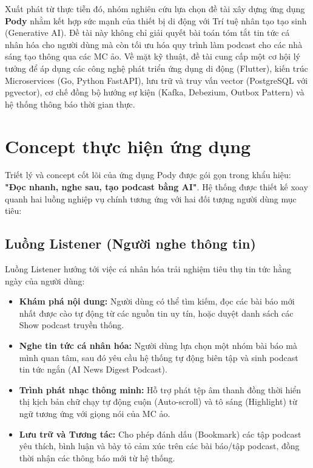 \documentclass[12pt,a4paper]{report}
\begin{document}
Xuất phát từ thực tiễn đó, nhóm nghiên cứu lựa chọn đề tài xây dựng ứng dụng \textbf{Pody} nhằm kết hợp sức mạnh của thiết bị di động với Trí tuệ nhân tạo tạo sinh (Generative AI). Đề tài này không chỉ giải quyết bài toán tóm tắt tin tức cá nhân hóa cho người dùng mà còn tối ưu hóa quy trình làm podcast cho các nhà sáng tạo thông qua các MC ảo. Về mặt kỹ thuật, đề tài cung cấp một cơ hội lý tưởng để áp dụng các công nghệ phát triển ứng dụng di động (Flutter), kiến trúc Microservices (Go, Python FastAPI), lưu trữ và truy vấn vector (PostgreSQL với pgvector), cơ chế đồng bộ hướng sự kiện (Kafka, Debezium, Outbox Pattern) và hệ thống thông báo thời gian thực.

\section{Concept thực hiện ứng dụng}
Triết lý và concept cốt lõi của ứng dụng Pody được gói gọn trong khẩu hiệu: \textbf{"Đọc nhanh, nghe sau, tạo podcast bằng AI"}. Hệ thống được thiết kế xoay quanh hai luồng nghiệp vụ chính tương ứng với hai đối tượng người dùng mục tiêu:

\subsection{Luồng Listener (Người nghe thông tin)}
Luồng Listener hướng tới việc cá nhân hóa trải nghiệm tiêu thụ tin tức hằng ngày của người dùng:
\begin{itemize}
    \item \textbf{Khám phá nội dung:} Người dùng có thể tìm kiếm, đọc các bài báo mới nhất được cào tự động từ các nguồn tin uy tín, hoặc duyệt danh sách các Show podcast truyền thống.
    \item \textbf{Nghe tin tức cá nhân hóa:} Người dùng lựa chọn một nhóm bài báo mà mình quan tâm, sau đó yêu cầu hệ thống tự động biên tập và sinh podcast tin tức ngắn (AI News Digest Podcast).
    \item \textbf{Trình phát nhạc thông minh:} Hỗ trợ phát tệp âm thanh đồng thời hiển thị kịch bản chữ chạy tự động cuộn (Auto-scroll) và tô sáng (Highlight) từ ngữ tương ứng với giọng nói của MC ảo.
    \item \textbf{Lưu trữ và Tương tác:} Cho phép đánh dấu (Bookmark) các tập podcast yêu thích, bình luận và bày tỏ cảm xúc trên các bài báo/tập podcast, đồng thời nhận các thông báo mới từ hệ thống.
\end{itemize}
\end{document}
